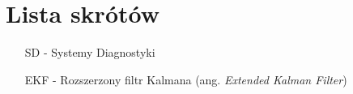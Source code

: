 \chapter*{Lista skrótów}

\begin{itemize}[noitemsep,topsep=0pt,parsep=0pt,partopsep=0pt,labelwidth=1cm,align=left,itemindent=0pt]
\item[SD] - Systemy Diagnostyki
\item[EKF] - Rozszerzony filtr Kalmana (ang. \textit{Extended Kalman Filter})
\end{itemize}